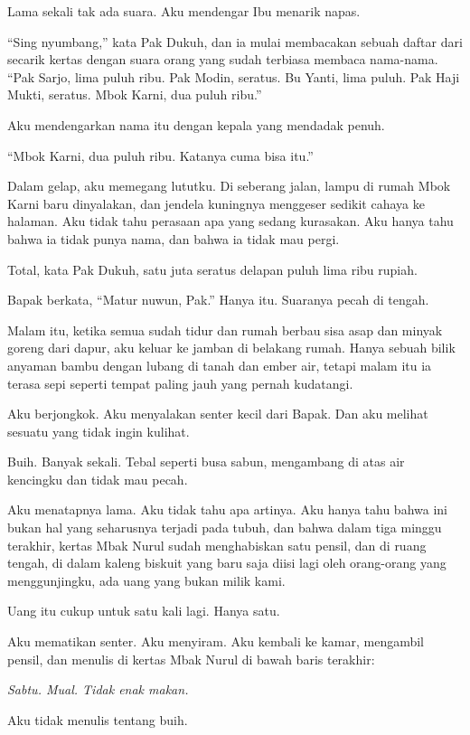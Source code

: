 \documentclass[11pt,twoside,openany]{book}
\makeatletter
\newcommand{\scenebreak}{\par\vspace{0.9em}{\centering\textsc{*\hspace{0.7em}*\hspace{0.7em}*}\par}\vspace{0.9em}\@afterindentfalse\@afterheading}
\makeatother
\begin{document}
Lama sekali tak ada suara. Aku mendengar Ibu menarik napas.

``Sing nyumbang,'' kata Pak Dukuh, dan ia mulai membacakan sebuah daftar dari secarik kertas dengan suara orang yang sudah terbiasa membaca nama-nama. ``Pak Sarjo, lima puluh ribu. Pak Modin, seratus. Bu Yanti, lima puluh. Pak Haji Mukti, seratus. Mbok Karni, dua puluh ribu.''

Aku mendengarkan nama itu dengan kepala yang mendadak penuh.

``Mbok Karni, dua puluh ribu. Katanya cuma bisa itu.''

Dalam gelap, aku memegang lututku. Di seberang jalan, lampu di rumah Mbok Karni baru dinyalakan, dan jendela kuningnya menggeser sedikit cahaya ke halaman. Aku tidak tahu perasaan apa yang sedang kurasakan. Aku hanya tahu bahwa ia tidak punya nama, dan bahwa ia tidak mau pergi.

Total, kata Pak Dukuh, satu juta seratus delapan puluh lima ribu rupiah.

Bapak berkata, ``Matur nuwun, Pak.'' Hanya itu. Suaranya pecah di tengah.

\scenebreak
Malam itu, ketika semua sudah tidur dan rumah berbau sisa asap dan minyak goreng dari dapur, aku keluar ke jamban di belakang rumah. Hanya sebuah bilik anyaman bambu dengan lubang di tanah dan ember air, tetapi malam itu ia terasa sepi seperti tempat paling jauh yang pernah kudatangi.

Aku berjongkok. Aku menyalakan senter kecil dari Bapak. Dan aku melihat sesuatu yang tidak ingin kulihat.

Buih. Banyak sekali. Tebal seperti busa sabun, mengambang di atas air kencingku dan tidak mau pecah.

Aku menatapnya lama. Aku tidak tahu apa artinya. Aku hanya tahu bahwa ini bukan hal yang seharusnya terjadi pada tubuh, dan bahwa dalam tiga minggu terakhir, kertas Mbak Nurul sudah menghabiskan satu pensil, dan di ruang tengah, di dalam kaleng biskuit yang baru saja diisi lagi oleh orang-orang yang menggunjingku, ada uang yang bukan milik kami.

Uang itu cukup untuk satu kali lagi. Hanya satu.

Aku mematikan senter. Aku menyiram. Aku kembali ke kamar, mengambil pensil, dan menulis di kertas Mbak Nurul di bawah baris terakhir:

\emph{Sabtu. Mual. Tidak enak makan.}

Aku tidak menulis tentang buih.
\end{document}
